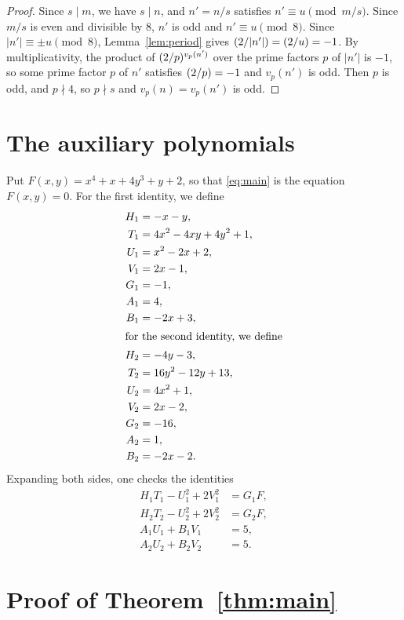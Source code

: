 \documentclass[11pt]{article}
\newcommand{\leg}[2]{\mathchoice{\biggl(\dfrac{#1}{#2}\biggr)}{(#1/#2)}{(#1/#2)}{(#1/#2)}}
\begin{document}
\begin{proof}
Since $s\mid m$, we have $s\mid n$, and $n'=n/s$ satisfies $n'\equiv u\pmod{m/s}$. Since $m/s$ is even and divisible by $8$, $n'$ is odd and $n'\equiv u\pmod{8}$. Since $|n'|\equiv\pm u\pmod{8}$, Lemma~\ref{lem:period} gives $\leg{2}{|n'|}=\leg{2}{u}=-1$. By multiplicativity, the product of $\leg{2}{p}^{v_p(n')}$ over the prime factors $p$ of $|n'|$ is $-1$, so some prime factor $p$ of $n'$ satisfies $\leg{2}{p}=-1$ and $v_p(n')$ is odd. Then $p$ is odd, and $p\nmid4$, so $p\nmid s$ and $v_p(n)=v_p(n')$ is odd.
\end{proof}

\section{The auxiliary polynomials}

Put $F(x,y)=x^{4}+x+4y^{3}+y+2$, so that \eqref{eq:main} is the equation $F(x,y)=0$.
For the first identity, we define
\begin{align*}
H_{1}&=-x-y,\\
T_{1}&=4x^{2}-4xy+4y^{2}+1,\\
U_{1}&=x^{2}-2x+2,\\
V_{1}&=2x-1,\\
G_{1}&=-1,\\
A_{1}&=4,\\
B_{1}&=-2x+3,\\
\intertext{for the second identity, we define}
H_{2}&=-4y-3,\\
T_{2}&=16y^{2}-12y+13,\\
U_{2}&=4x^{2}+1,\\
V_{2}&=2x-2,\\
G_{2}&=-16,\\
A_{2}&=1,\\
B_{2}&=-2x-2.
\end{align*}
Expanding both sides, one checks the identities
\begin{align}
H_{1}T_{1}-U_{1}^2+2V_{1}^2&=G_{1}F,\label{eq:norm1}\\
H_{2}T_{2}-U_{2}^2+2V_{2}^2&=G_{2}F,\label{eq:norm2}\\
A_{1}U_{1}+B_{1}V_{1}&=5,\label{eq:bez1}\\
A_{2}U_{2}+B_{2}V_{2}&=5.\label{eq:bez2}
\end{align}

\section{Proof of Theorem~\ref{thm:main}}
\end{document}
